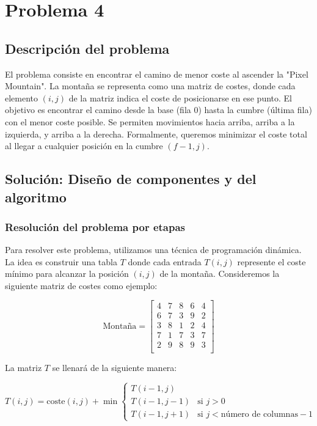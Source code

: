 \chapter{Problema 4}

\section{Descripción del problema}
El problema consiste en encontrar el camino de menor coste al ascender la "Pixel Mountain". La montaña se representa como una matriz de costes, donde cada elemento $(i, j)$ de la matriz indica el coste de posicionarse en ese punto. El objetivo es encontrar el camino desde la base (fila 0) hasta la cumbre (última fila) con el menor coste posible. Se permiten movimientos hacia arriba, arriba a la izquierda, y arriba a la derecha. Formalmente, queremos minimizar el coste total al llegar a cualquier posición en la cumbre $(f-1, j)$.

\section{Solución: Diseño de componentes y del algoritmo}

\subsection{Resolución del problema por etapas}
Para resolver este problema, utilizamos una técnica de programación dinámica. La idea es construir una tabla $T$ donde cada entrada $T(i, j)$ represente el coste mínimo para alcanzar la posición $(i, j)$ de la montaña. Consideremos la siguiente matriz de costes como ejemplo:

\[
\text{Montaña} = \begin{bmatrix}
4 & 7 & 8 & 6 & 4 \\
6 & 7 & 3 & 9 & 2 \\
3 & 8 & 1 & 2 & 4 \\
7 & 1 & 7 & 3 & 7 \\
2 & 9 & 8 & 9 & 3 \\
\end{bmatrix}
\]

La matriz $T$ se llenará de la siguiente manera:

\[
T(i, j) = \text{coste}(i, j) + \min \begin{cases} 
T(i-1, j) \\
T(i-1, j-1) & \text{si } j > 0 \\
T(i-1, j+1) & \text{si } j < \text{número de columnas} - 1 
\end{cases}
\]

